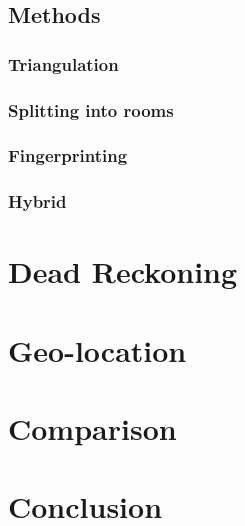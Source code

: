 \documentclass[12pt,a4paper]{article}
\begin{document}
\subsection{Methods}
\subsubsection{Triangulation}
\subsubsection{Splitting into rooms}
\subsubsection{Fingerprinting}
\subsubsection{Hybrid}

\section{Dead Reckoning}


\section{Geo-location}

\section{Comparison}

\section{Conclusion}




\end{document}
